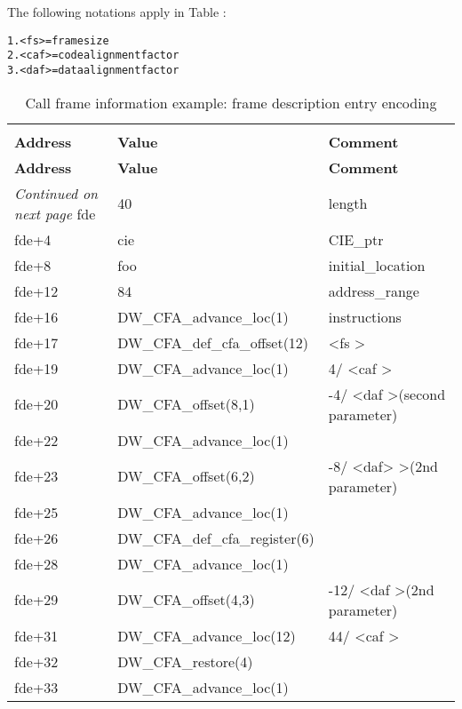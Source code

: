 The following notations apply in 
Table :

\begin{alltt}
1. <fs> = frame size
2. <caf> = code alignment factor
3. <daf> = data alignment factor
\end{alltt}


\begin{centering}
\setlength{\extrarowheight}{0.1cm}
\begin{longtable}{lll}
  \caption{Call frame information example: frame description entry encoding} \label{tab:callframeinformationexampleframedescriptionentryencoding} \\
  \hline \\ \bfseries Address &\bfseries Value &\bfseries Comment \\ \hline
\endfirsthead
  \bfseries Address &\bfseries Value &\bfseries Comment \\ \hline
\endhead
  \hline \emph{Continued on next page}
\endfoot
  \hline
\endlastfoot
fde&40&length \\
fde+4&cie&CIE\_ptr \\
fde+8&foo&initial\_location \\
fde+12&84&address\_range \\
fde+16&DW\-\_CFA\-\_advance\-\_loc(1)&instructions \\
fde+17&DW\-\_CFA\-\_def\-\_cfa\-\_offset(12)& \textless fs \textgreater \\
fde+19&DW\-\_CFA\-\_advance\-\_loc(1)&4/ \textless caf \textgreater \\
fde+20&DW\-\_CFA\-\_offset(8,1)&-4/ \textless daf \textgreater (second parameter) \\
fde+22&DW\-\_CFA\-\_advance\-\_loc(1)& \\
fde+23&DW\-\_CFA\-\_offset(6,2)&-8/ \textless daf> \textgreater (2nd parameter)  \\
fde+25&DW\-\_CFA\-\_advance\-\_loc(1) & \\
fde+26&DW\-\_CFA\-\_def\-\_cfa\-\_register(6) & \\
fde+28&DW\-\_CFA\-\_advance\-\_loc(1) & \\
fde+29&DW\-\_CFA\-\_offset(4,3)&-12/ \textless daf \textgreater (2nd parameter) \\
fde+31&DW\-\_CFA\-\_advance\-\_loc(12)&44/ \textless caf \textgreater \\
fde+32&DW\-\_CFA\-\_restore(4)& \\
fde+33&DW\-\_CFA\-\_advance\-\_loc(1) & \\

\end{longtable}
\end{centering}
